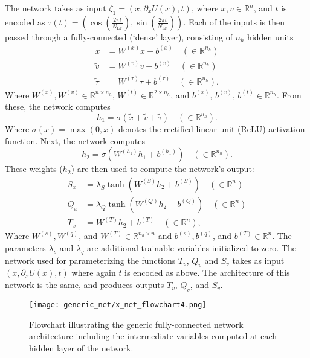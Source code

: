\documentclass[../main.tex]{subfiles}
\begin{document}
The network takes as input $\zeta_1 = (x, \partial_{x} U(x), t)$, where $x, v
\in \mathbb{R}^{n}$, and $t$ is encoded as $\tau(t) = \left(\cos{(\frac{2\pi
t}{N_{\mathrm{LF}}})},\right.  \left.\sin{(\frac{2\pi
t}{N_{\mathrm{LF}}})}\right)$.
%
Each of the inputs is then passed through a fully-connected (`dense' layer),
consisting of $n_h$ hidden units
%
\begin{align}
    \tilde x &= W^{(x)} x + b^{(x)} \quad (\in \mathbb{R}^{n_h})\\
    \tilde v &= W^{(v)} v + b^{(v)} \quad (\in \mathbb{R}^{n_h})\\
    \tilde \tau &= W^{(\tau)} \tau + b^{(\tau)} \quad (\in \mathbb{R}^{n_h}).
\end{align}
%
Where $W^{(x)}, W^{(v)} \in \mathbb{R}^{n \times n_h}$, $W^{(t)} \in
\mathbb{R}^{2 \times n_h}$, and $b^{(x)}$, $b^{(v)}$,  $b^{(t)} \in
\mathbb{R}^{n_h}$.
%
From these, the network computes
%
\begin{equation}
    h_1 = \sigma(\tilde x + \tilde v + \tilde \tau) \quad (\in
    \mathbb{R}^{n_h}).
    \label{eq:hidden_1}
\end{equation}
%
Where $\sigma(x) = \max(0, x)$ denotes the rectified linear unit (ReLU)
activation function.
%
Next, the network computes
%
\begin{equation}
    h_2 = \sigma\left(W^{(h_1)} h_1 + b^{(h_1)}\right) \quad (\in
    \mathbb{R}^{n_h}).
    \label{eq:hidden_2}
\end{equation}
%
These weights ($h_2$) are then used to compute the network's output:
%
\begin{align}
    S_x &= \lambda_S \tanh(W^{(S)} h_2 + b^{(S)})\quad (\in \mathbb{R}^{n})\\
    Q_x &= \lambda_{Q} \tanh(W^{(Q)} h_2 + b^{(Q)})\quad (\in \mathbb{R}^{n})\\
    T_x &= W^{(T)} h_2 + b^{(T)}\quad (\in \mathbb{R}^{n}),
\end{align}
%
Where $W^{(s)}, W^{(q)}$, and $W^{(T)} \in \mathbb{R}^{n_h \times n}$ and
$b^{(s)}, b^{(q)}$, and $b^{(T)} \in \mathbb{R}^{n}$.
%
The parameters $\lambda_s$ and $\lambda_q$ are additional trainable variables
initialized to zero.
%
The network used for parameterizing the functions $T_v$, $Q_v$ and $S_v$ takes
as input $(x, \partial_x U(x), t)$ where again $t$ is encoded as above.  The
architecture of this network is the same, and produces outputs $T_v$, $Q_v$,
and $S_v$.

\begin{figure}[htpb]
  \centering
  \texttt{[image: generic\_net/x\_net\_flowchart4.png]}
  \caption{Flowchart illustrating the generic fully-connected network
    architecture including the intermediate variables computed at each hidden
    layer of the network.}%
\label{fig:x_net_flowchart}
\end{figure}
\end{document}
